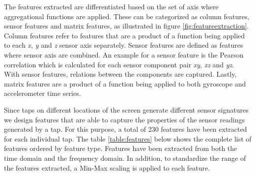 The features extracted are differentiated based on the set of axis where aggregational functions are applied. These can be categorized as column features, sensor features and matrix features, as illustrated in figure \ref{fig:featureextraction}. Column features refer to features that are a product of a function being applied to each \textit{x}, \textit{y} and \textit{z} sensor axis separately. Sensor features are defined as features where sensor axis are combined. An example for a sensor feature is the Pearson correlation which is calculated for each sensor component pair \textit{xy}, \textit{xz} and \textit{yz}. With sensor features, relations between the components are captured. Lastly, matrix features are a product of a function being applied to both gyroscope and accelerometer time series.

Since taps on different locations of the screen generate different sensor signatures we design features that are able to capture the properties of the sensor readings generated by a tap. For this purpose, a total of 230 features have been extracted for each individual tap. The table \ref{table:features} below shows the complete list of features ordered by feature type. Features have been extracted from both the time domain and the frequency domain. In addition, to standardize the range of the features extracted, a Min-Max scaling is applied to each feature.

